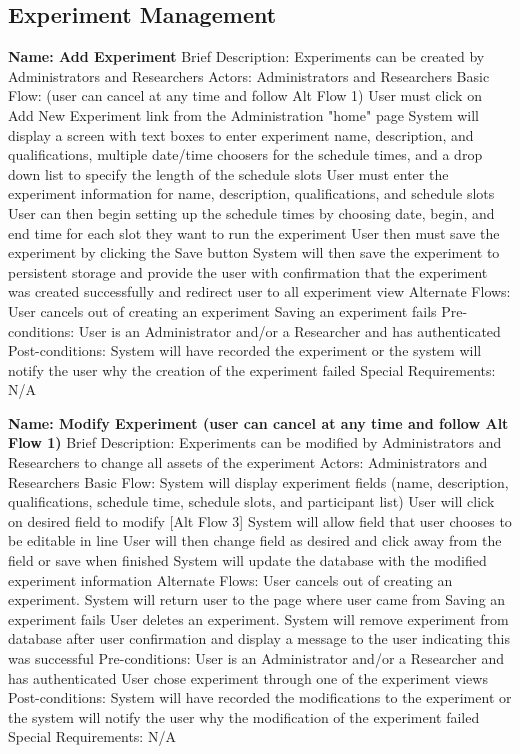 \begin{outline}[enumerate]
\end{outline}
\subsection{Experiment Management}
\begin{outline}[enumerate]



\1 {\bf Name: Add Experiment}
\2 Brief Description: Experiments can be created by Administrators and Researchers
\2 Actors: Administrators and Researchers
\2 Basic Flow: (user can cancel at any time and follow Alt Flow 1)
\3 User must click on Add New Experiment link from the Administration "home" page
\3 System will display a screen with text boxes to enter experiment name, description,  and qualifications, multiple date/time choosers for the schedule times, and a drop down list to specify the length of the schedule slots
\3 User must enter the experiment information for name, description, qualifications, and schedule slots
\3 User can then begin setting up the schedule times by choosing date, begin, and end time for each slot they want to run the experiment
\3 User then must save the experiment by clicking the Save button
\3 System will then save the experiment to persistent storage and provide the user with confirmation that the experiment was created successfully and redirect user to all experiment view
\2 Alternate Flows:
\3 User cancels out of creating an experiment
\3 Saving an experiment fails
\2 Pre-conditions:
\3 User is an Administrator and/or a Researcher and has authenticated
\2 Post-conditions:
\3 System will have recorded the experiment or the system will notify the user why the creation of the experiment failed
\2 Special Requirements:
\3 N/A

\1 {\bf Name: Modify Experiment (user can cancel at any time and follow Alt Flow 1)}
\2 Brief Description: Experiments can be modified by Administrators and Researchers to change all assets of the experiment
\2 Actors: Administrators and Researchers
\2 Basic Flow:
\3 System will display experiment fields (name, description, qualifications, schedule time, schedule slots, and participant list)
\3 User will click on desired field to modify [Alt Flow 3]
\3 System will allow field that user chooses to be editable in line
\3 User will then change field as desired and click away from the field or save when finished
\3 System will update the database with the modified experiment information
\2 Alternate Flows:
\3 User cancels out of creating an experiment. System will return user to the page where user came from
\3 Saving an experiment fails
\3 User deletes an experiment. System will remove experiment from database after user confirmation and display a message to the user indicating this was successful
\2 Pre-conditions:
\3 User is an Administrator and/or a Researcher and has authenticated
\3 User chose experiment through one of the experiment views
\2 Post-conditions:
\3 System will have recorded the modifications to the experiment or the system will notify the user why the modification of the experiment failed
\2 Special Requirements:
\3 N/A

\end{outline}
